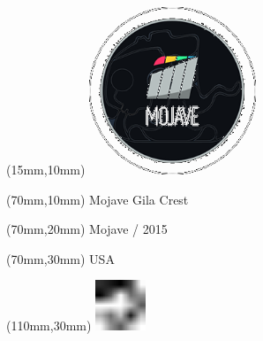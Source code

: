 \null\newpage
\begin{textblock*}{50mm}(15mm,10mm)%
\includegraphics[width=50mm]{LG/MOJ.png}
\end{textblock*}
\begin{textblock*}{130mm}(70mm,10mm)%
{\fontsize{20}{20}\selectfont Mojave Gila Crest}\\
\end{textblock*}
\begin{textblock*}{120mm}(70mm,20mm)%
{\fontsize{16}{16}\selectfont Mojave / 2015}\\
\end{textblock*}
\begin{textblock*}{120mm}(70mm,30mm)%
{\fontsize{12}{12}\selectfont USA}
\end{textblock*}
\begin{textblock*}{30mm}(110mm,30mm)%
\centering
\includegraphics[height=15mm]{icons/fa-rotate-left.pdf}
\end{textblock*}
